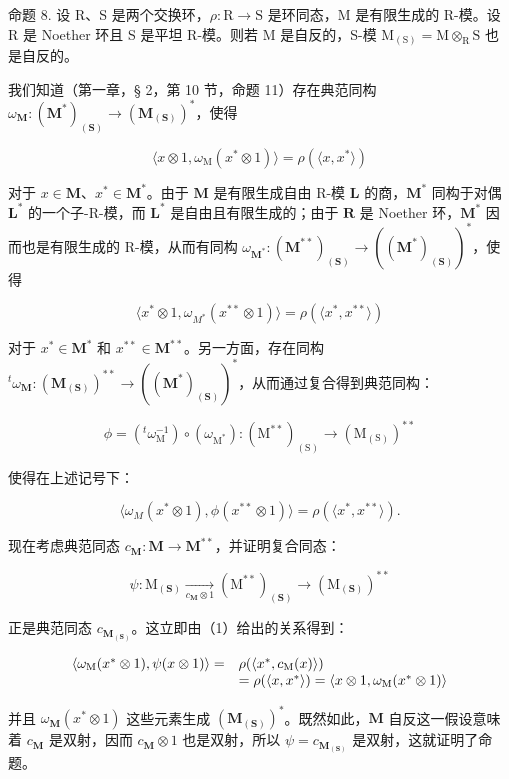 命题 8. 设 R、S 是两个交换环，\(\rho: \mathrm{R} \to \mathrm{S}\) 是环同态，M 是有限生成的 R-模。设 R 是 Noether 环且 S 是平坦 R-模。则若 M 是自反的，S-模 \(\mathrm{M}_{(\mathrm{S})} = \mathrm{M} \otimes_{\mathrm{R}} \mathrm{S}\) 也是自反的。

我们知道（第一章，§ 2，第 10 节，命题 11）存在典范同构 \(\omega_{\mathbf{M}}\colon (\mathbf{M}^{*})_{(\mathbf{S})}\to (\mathbf{M}_{(\mathbf{S})})^{*}\)，使得

\[
\langle x \otimes 1, \omega_ {\mathrm{M}} (x ^ {*} \otimes 1) \rangle = \rho (\langle x, x ^ {*} \rangle)
\]

对于 \(x \in \mathbf{M}\)、\(x^{*} \in \mathbf{M}^{*}\)。由于 \(\mathbf{M}\) 是有限生成自由 R-模 \(\mathbf{L}\) 的商，\(\mathbf{M}^{*}\) 同构于对偶 \(\mathbf{L}^{*}\) 的一个子-R-模，而 \(\mathbf{L}^{*}\) 是自由且有限生成的；由于 \(\mathbf{R}\) 是 Noether 环，\(\mathbf{M}^{*}\) 因而也是有限生成的 R-模，从而有同构 \(\omega_{\mathbf{M}^{*}}: (\mathbf{M}^{**})_{(\mathbf{S})} \to ((\mathbf{M}^{*})_{(\mathbf{S})})^{*}\)，使得

\[
\langle x ^ {*} \otimes 1, \omega_ {M ^ {*}} (x ^ {* *} \otimes 1) \rangle = \rho (\langle x ^ {*}, x ^ {* *} \rangle)
\]

对于 \(x^{*} \in \mathbf{M}^{*}\) 和 \(x^{**} \in \mathbf{M}^{**}\)。另一方面，存在同构 \(^t\omega_{\mathbf{M}}: (\mathbf{M}_{(\mathbf{S})})^{**} \to ((\mathbf{M}^{*})_{(\mathbf{S})})^{*}\)，从而通过复合得到典范同构：

\[
\phi = \left(^ {t} \omega_ {\mathrm{M}} ^ {- 1}\right) \circ (\omega_ {\mathrm{M} ^ {*}}): (\mathrm{M} ^ {* *}) _ {(\mathrm{S})} \rightarrow (\mathrm{M} _ {(\mathrm{S})}) ^ {* *}
\]

使得在上述记号下：

\[
\langle \omega_ {M} (x ^ {*} \otimes 1), \phi (x ^ {* *} \otimes 1) \rangle = \rho (\langle x ^ {*}, x ^ {* *} \rangle).\tag{1}
\]

现在考虑典范同态 \(c_{\mathbf{M}}: \mathbf{M} \to \mathbf{M}^{**}\)，并证明复合同态：

\[
\psi : \mathrm{M} _ {(\mathbf {S})} \xrightarrow [ c _ {\mathbf {M}} \otimes 1 ]{} (\mathrm{M} ^ {* *}) _ {(\mathbf {S})} \longrightarrow (\mathrm{M} _ {(\mathbf {S})}) ^ {* *}\tag{2}
\]

正是典范同态 \(c_{\mathbf{M}_{(\mathbf{S})}}\)。这立即由（1）给出的关系得到：

\[
\begin{array}{r l} \langle \omega_ {\mathrm{M}} (x ^ {*} \otimes 1), \psi (x \otimes 1) \rangle = & \rho (\langle x ^ {*}, c _ {\mathrm{M}} (x) \rangle) \\ & = \rho (\langle x, x ^ {*} \rangle) = \langle x \otimes 1, \omega_ {\mathrm{M}} (x ^ {*} \otimes 1) \rangle \end{array}
\]

并且 \(\omega_{\mathbf{M}}(x^{*}\otimes 1)\) 这些元素生成 \((\mathbf{M}_{(\mathbf{S})})^{*}\)。既然如此，\(\mathbf{M}\) 自反这一假设意味着 \(c_{\mathbf{M}}\) 是双射，因而 \(c_{\mathbf{M}}\otimes 1\) 也是双射，所以 \(\psi = c_{\mathbf{M}_{(\mathbf{S})}}\) 是双射，这就证明了命题。

